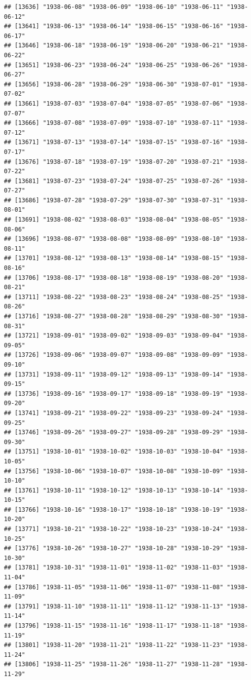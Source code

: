 \documentclass{article}\usepackage[]{graphicx}\usepackage[]{color}
\makeatletter
\newenvironment{kframe}{%
 \def\at@end@of@kframe{}%
 \ifinner\ifhmode%
  \def\at@end@of@kframe{\end{minipage}}%
  \begin{minipage}{\columnwidth}%
 \fi\fi%
 \def\FrameCommand##1{\hskip\@totalleftmargin \hskip-\fboxsep
 \colorbox{shadecolor}{##1}\hskip-\fboxsep
     \hskip-\linewidth \hskip-\@totalleftmargin \hskip\columnwidth}%
 \MakeFramed {\advance\hsize-\width
   \@totalleftmargin\z@ \linewidth\hsize
   \@setminipage}}%
 {\par\unskip\endMakeFramed%
 \at@end@of@kframe}
\newenvironment{knitrout}{}{} %
\makeatother
\begin{document}
\begin{description}
\begin{knitrout}
\begin{kframe}
\begin{verbatim}
## [13636] "1938-06-08" "1938-06-09" "1938-06-10" "1938-06-11" "1938-06-12"
## [13641] "1938-06-13" "1938-06-14" "1938-06-15" "1938-06-16" "1938-06-17"
## [13646] "1938-06-18" "1938-06-19" "1938-06-20" "1938-06-21" "1938-06-22"
## [13651] "1938-06-23" "1938-06-24" "1938-06-25" "1938-06-26" "1938-06-27"
## [13656] "1938-06-28" "1938-06-29" "1938-06-30" "1938-07-01" "1938-07-02"
## [13661] "1938-07-03" "1938-07-04" "1938-07-05" "1938-07-06" "1938-07-07"
## [13666] "1938-07-08" "1938-07-09" "1938-07-10" "1938-07-11" "1938-07-12"
## [13671] "1938-07-13" "1938-07-14" "1938-07-15" "1938-07-16" "1938-07-17"
## [13676] "1938-07-18" "1938-07-19" "1938-07-20" "1938-07-21" "1938-07-22"
## [13681] "1938-07-23" "1938-07-24" "1938-07-25" "1938-07-26" "1938-07-27"
## [13686] "1938-07-28" "1938-07-29" "1938-07-30" "1938-07-31" "1938-08-01"
## [13691] "1938-08-02" "1938-08-03" "1938-08-04" "1938-08-05" "1938-08-06"
## [13696] "1938-08-07" "1938-08-08" "1938-08-09" "1938-08-10" "1938-08-11"
## [13701] "1938-08-12" "1938-08-13" "1938-08-14" "1938-08-15" "1938-08-16"
## [13706] "1938-08-17" "1938-08-18" "1938-08-19" "1938-08-20" "1938-08-21"
## [13711] "1938-08-22" "1938-08-23" "1938-08-24" "1938-08-25" "1938-08-26"
## [13716] "1938-08-27" "1938-08-28" "1938-08-29" "1938-08-30" "1938-08-31"
## [13721] "1938-09-01" "1938-09-02" "1938-09-03" "1938-09-04" "1938-09-05"
## [13726] "1938-09-06" "1938-09-07" "1938-09-08" "1938-09-09" "1938-09-10"
## [13731] "1938-09-11" "1938-09-12" "1938-09-13" "1938-09-14" "1938-09-15"
## [13736] "1938-09-16" "1938-09-17" "1938-09-18" "1938-09-19" "1938-09-20"
## [13741] "1938-09-21" "1938-09-22" "1938-09-23" "1938-09-24" "1938-09-25"
## [13746] "1938-09-26" "1938-09-27" "1938-09-28" "1938-09-29" "1938-09-30"
## [13751] "1938-10-01" "1938-10-02" "1938-10-03" "1938-10-04" "1938-10-05"
## [13756] "1938-10-06" "1938-10-07" "1938-10-08" "1938-10-09" "1938-10-10"
## [13761] "1938-10-11" "1938-10-12" "1938-10-13" "1938-10-14" "1938-10-15"
## [13766] "1938-10-16" "1938-10-17" "1938-10-18" "1938-10-19" "1938-10-20"
## [13771] "1938-10-21" "1938-10-22" "1938-10-23" "1938-10-24" "1938-10-25"
## [13776] "1938-10-26" "1938-10-27" "1938-10-28" "1938-10-29" "1938-10-30"
## [13781] "1938-10-31" "1938-11-01" "1938-11-02" "1938-11-03" "1938-11-04"
## [13786] "1938-11-05" "1938-11-06" "1938-11-07" "1938-11-08" "1938-11-09"
## [13791] "1938-11-10" "1938-11-11" "1938-11-12" "1938-11-13" "1938-11-14"
## [13796] "1938-11-15" "1938-11-16" "1938-11-17" "1938-11-18" "1938-11-19"
## [13801] "1938-11-20" "1938-11-21" "1938-11-22" "1938-11-23" "1938-11-24"
## [13806] "1938-11-25" "1938-11-26" "1938-11-27" "1938-11-28" "1938-11-29"

\end{verbatim}
\end{kframe}
\end{knitrout}
\end{description}
\end{document}
